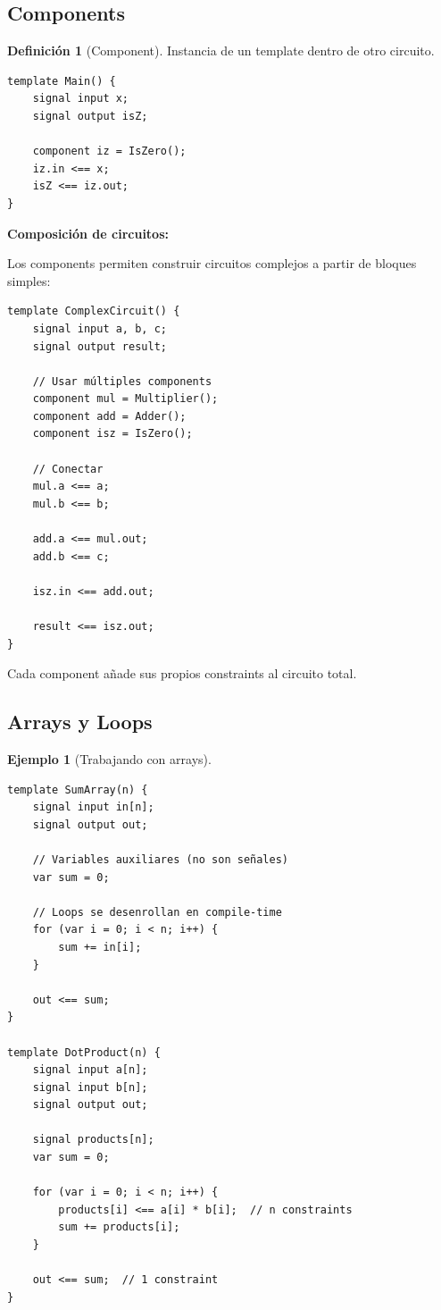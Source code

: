 \documentclass[11pt,a4paper,twoside,openright]{book}
\theoremstyle{definition}
\newtheorem{definition}{Definición}[chapter]
\newtheorem{example}{Ejemplo}[chapter]
\theoremstyle{plain}
\theoremstyle{remark}
\begin{document}
\subsection{Components}

\begin{definition}[Component]
Instancia de un template dentro de otro circuito.
\end{definition}

\begin{verbatim}
template Main() {
    signal input x;
    signal output isZ;
    
    component iz = IsZero();
    iz.in <== x;
    isZ <== iz.out;
}
\end{verbatim}

\begin{keyidea}
\textbf{Composición de circuitos:}

Los components permiten construir circuitos complejos a partir de bloques simples:

\begin{verbatim}
template ComplexCircuit() {
    signal input a, b, c;
    signal output result;
    
    // Usar múltiples components
    component mul = Multiplier();
    component add = Adder();
    component isz = IsZero();
    
    // Conectar
    mul.a <== a;
    mul.b <== b;
    
    add.a <== mul.out;
    add.b <== c;
    
    isz.in <== add.out;
    
    result <== isz.out;
}
\end{verbatim}

Cada component añade sus propios constraints al circuito total.
\end{keyidea}

\subsection{Arrays y Loops}

\begin{example}[Trabajando con arrays]
\begin{verbatim}
template SumArray(n) {
    signal input in[n];
    signal output out;
    
    // Variables auxiliares (no son señales)
    var sum = 0;
    
    // Loops se desenrollan en compile-time
    for (var i = 0; i < n; i++) {
        sum += in[i];
    }
    
    out <== sum;
}

template DotProduct(n) {
    signal input a[n];
    signal input b[n];
    signal output out;
    
    signal products[n];
    var sum = 0;
    
    for (var i = 0; i < n; i++) {
        products[i] <== a[i] * b[i];  // n constraints
        sum += products[i];
    }
    
    out <== sum;  // 1 constraint
}
\end{verbatim}
\end{example}
\end{document}
